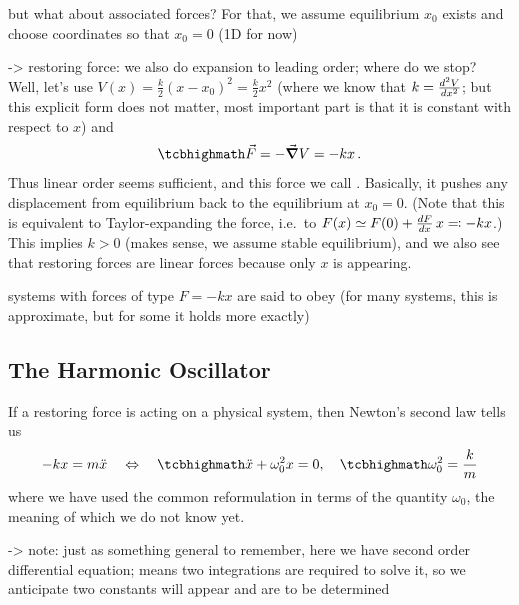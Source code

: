 \documentclass[../class_mech_main.tex]{subfiles}
\begin{document}
but what about associated forces? For that, we assume equilibrium $x_0$ exists and choose coordinates so that $x_0 = 0$ (1D for now)

-> restoring force: we also do expansion to leading order; where do we stop? Well, let's use $V(x) = \frac{k}{2} (x - x_0)^2 = \frac{k}{2} x^2$ (where we know that $k = \dv[2]{V}{x}(x_0 = 0)$; but this explicit form does not matter, most important part is that it is constant with respect to $x$) and
\begin{equation}\label{eq:restoring_force}
	\eqbox{
		\vec{F} = - \grad V = - k x
	} \, .
\end{equation}
Thus linear order seems sufficient, and this force we call . Basically, it pushes any displacement from equilibrium back to the equilibrium at $x_0 = 0$. (Note that this is equivalent to Taylor-expanding the force, i.e.~to $F(x) \simeq F(0) + \dv{F}{x}(x_0) \, x \eqqcolon - k x$.) This implies $k > 0$ (makes sense, we assume stable equilibrium), and we also see that restoring forces are linear forces because only $x$ is appearing.



systems with forces of type $F = - k x$ are said to obey  (for many systems, this is approximate, but for some it holds more exactly)



		\subsection{The Harmonic Oscillator}
If a restoring force is acting on a physical system, then Newton's second law tells us
\begin{equation}
	- k x = m \ddot{x}
	\quad \Leftrightarrow \quad
	\eqbox{
		\ddot{x} + \omega_0^2 x = 0
	}
	, \quad
	\eqbox{
		\omega_0^2 = \frac{k}{m}
	}
\end{equation}
where we have used the common reformulation in terms of the quantity $\omega_0$, the meaning of which we do not know yet.

-> note: just as something general to remember, here we have second order differential equation; means two integrations are required to solve it, so we anticipate two constants will appear and are to be determined
\end{document}
